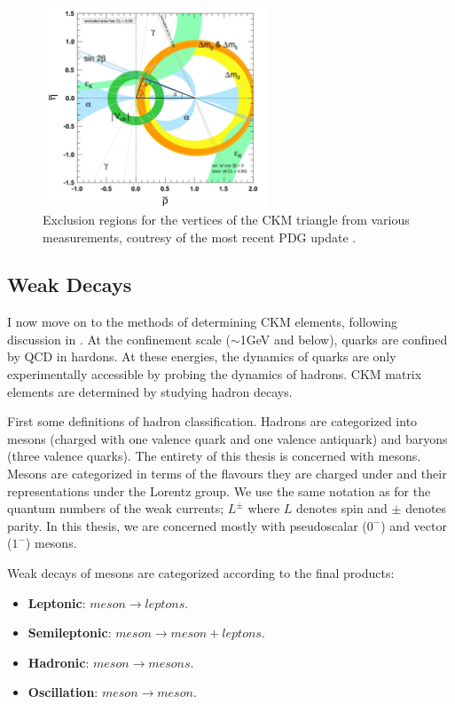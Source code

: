 \begin{figure}
  \vspace{-10pt}
  \begin{center}
    \includegraphics[width=0.6\textwidth]{images/ckmpdg.jpg}
  \end{center}
  \vspace{-15pt}
  \caption{Exclusion regions for the vertices of the CKM triangle from various measurements, coutresy of the most recent PDG update \cite{PhysRevD.98.030001}.}
  \label{fig:ckmpdg}
\end{figure}

\subsection{Weak Decays}
\label{sec:weakdecays}

I now move on to the methods of determining CKM elements, following discussion in \cite{Fleischer:2006fx}. At the confinement scale ($\sim$1GeV and below), quarks are confined by QCD in hardons. At these energies, the dynamics of quarks are only experimentally accessible by probing the dynamics of hadrons. CKM matrix elements are determined by studying hadron decays.

First some definitions of hadron classification. Hadrons are categorized into mesons (charged with one valence quark and one valence antiquark) and baryons (three valence quarks). The entirety of this thesis is concerned with mesons. Mesons are categorized in terms of the flavours they are charged under and their representations under the Lorentz group. We use the same notation as for the quantum numbers of the weak currents; $L^{\pm}$ where $L$ denotes spin and $\pm$ denotes parity. In this thesis, we are concerned mostly with pseudoscalar ($0^-$) and vector ($1^-$) mesons.

Weak decays of mesons are categorized according to the final products:
\begin{itemize}
\item
  {\bf{Leptonic}}: $meson \to leptons$.
\item
  {\bf{Semileptonic}}: $meson \to meson + leptons$.
\item
  {\bf{Hadronic}}: $meson \to mesons$.
\item
  {\bf{Oscillation}}: $meson \to meson$.
\end{itemize}

